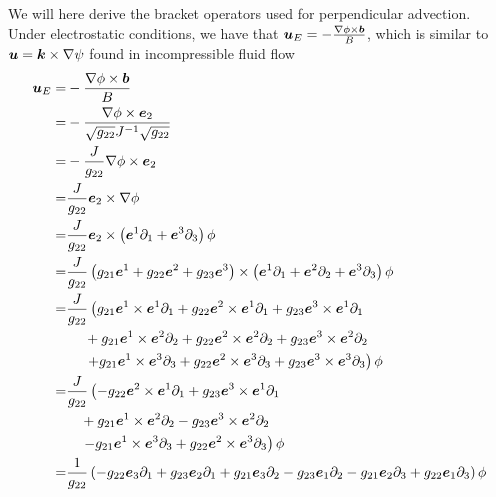 We will here derive the bracket operators used for perpendicular advection.
Under electrostatic conditions, we have that $\boldsymbol{u}_E =
-\frac{\nabla\phi\times\boldsymbol{b}}{B}$, which is similar to
$\boldsymbol{u}=\boldsymbol{k}\times\nabla\psi$ found in incompressible fluid flow
%
\begin{align*}
    \boldsymbol{u}_E =& -\frac{\nabla\phi\times\boldsymbol{b}}{B}\\
         =&-\frac{\nabla\phi\times\boldsymbol{e}_2}{
               \sqrt{g_{22}}J^{-1}\sqrt{g_{22}}}\\
         =&-\frac{J}{g_{22}}\nabla\phi\times\boldsymbol{e}_2\\
         =&\frac{J}{g_{22}}\boldsymbol{e}_2\times\nabla\phi\\
         =&\frac{J}{g_{22}}\boldsymbol{e}_2\times
           \left(\boldsymbol{e}^1\partial_1 + \boldsymbol{e}^3\partial_3\right)\phi\\
         =&\frac{J}{g_{22}}
           \left(g_{21}\boldsymbol{e}^1 + g_{22}\boldsymbol{e}^2 + g_{23}\boldsymbol{e}^3\right)
           \times
           \left(\boldsymbol{e}^1\partial_1 +
              \boldsymbol{e}^2\partial_2 +
                  \boldsymbol{e}^3\partial_3\right)\phi\\
         =&\frac{J}{g_{22}}
           \left(
             g_{21}\boldsymbol{e}^1\times\boldsymbol{e}^1\partial_1
           + g_{22}\boldsymbol{e}^2\times\boldsymbol{e}^1\partial_1
           + g_{23}\boldsymbol{e}^3\times\boldsymbol{e}^1\partial_1
           \right.
           \\
           &\quad\;
           + g_{21}\boldsymbol{e}^1\times\boldsymbol{e}^2\partial_2
           + g_{22}\boldsymbol{e}^2\times\boldsymbol{e}^2\partial_2
           + g_{23}\boldsymbol{e}^3\times\boldsymbol{e}^2\partial_2
           \\
           &\quad\;
           \left.
           + g_{21}\boldsymbol{e}^1\times\boldsymbol{e}^3\partial_3
           + g_{22}\boldsymbol{e}^2\times\boldsymbol{e}^3\partial_3
           + g_{23}\boldsymbol{e}^3\times\boldsymbol{e}^3\partial_3
           \right)
           \phi\\
         =&\frac{J}{g_{22}}
           \left(
           - g_{22}\boldsymbol{e}^2\times\boldsymbol{e}^1\partial_1
           + g_{23}\boldsymbol{e}^3\times\boldsymbol{e}^1\partial_1
           \right.
           \\
           &\quad
           + g_{21}\boldsymbol{e}^1\times\boldsymbol{e}^2\partial_2
           - g_{23}\boldsymbol{e}^3\times\boldsymbol{e}^2\partial_2
           \\
           &\quad
           \left.
           - g_{21}\boldsymbol{e}^1\times\boldsymbol{e}^3\partial_3
           + g_{22}\boldsymbol{e}^2\times\boldsymbol{e}^3\partial_3
           \right)
           \phi\\
         =&\frac{1}{g_{22}}
           \left(
           - g_{22}\boldsymbol{e}_3\partial_1
           + g_{23}\boldsymbol{e}_2\partial_1
           + g_{21}\boldsymbol{e}_3\partial_2
           - g_{23}\boldsymbol{e}_1\partial_2
           - g_{21}\boldsymbol{e}_2\partial_3
           + g_{22}\boldsymbol{e}_1\partial_3
           \right)
           \phi
\end{align*}
